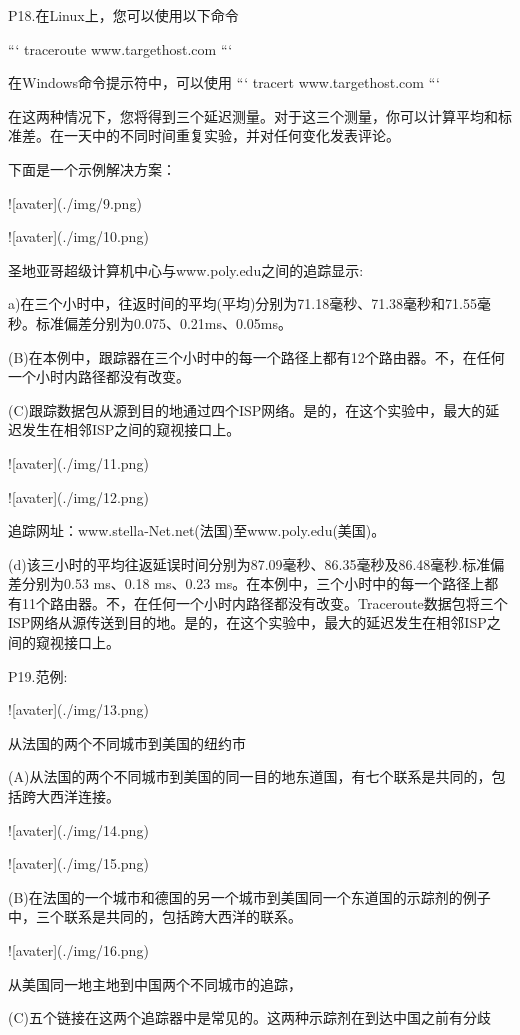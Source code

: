 \documentclass[11pt,UTF8,twoside]{article}
\begin{document}
	P18.在Linux上，您可以使用以下命令
	
	```
	traceroute www.targethost.com 
	```
	
	在Windows命令提示符中，可以使用
	```
	tracert www.targethost.com 
	```
	
	在这两种情况下，您将得到三个延迟测量。对于这三个测量，你可以计算平均和标准差。在一天中的不同时间重复实验，并对任何变化发表评论。
	
	下面是一个示例解决方案：
	
	![avater](./img/9.png)
	
	![avater](./img/10.png)
	
	圣地亚哥超级计算机中心与www.poly.edu之间的追踪显示:
	
	a)在三个小时中，往返时间的平均(平均)分别为71.18毫秒、71.38毫秒和71.55毫秒。标准偏差分别为0.075、0.21ms、0.05ms。
	
	(B)在本例中，跟踪器在三个小时中的每一个路径上都有12个路由器。不，在任何一个小时内路径都没有改变。
	
	(C)跟踪数据包从源到目的地通过四个ISP网络。是的，在这个实验中，最大的延迟发生在相邻ISP之间的窥视接口上。
	
	![avater](./img/11.png)
	
	![avater](./img/12.png)
	
	追踪网址：www.stella-Net.net(法国)至www.poly.edu(美国)。
	
	(d)该三小时的平均往返延误时间分别为87.09毫秒、86.35毫秒及86.48毫秒.标准偏差分别为0.53 ms、0.18 ms、0.23 ms。在本例中，三个小时中的每一个路径上都有11个路由器。不，在任何一个小时内路径都没有改变。Traceroute数据包将三个ISP网络从源传送到目的地。是的，在这个实验中，最大的延迟发生在相邻ISP之间的窥视接口上。
	
	P19.范例:
	
	![avater](./img/13.png)
	
	从法国的两个不同城市到美国的纽约市
	
	(A)从法国的两个不同城市到美国的同一目的地东道国，有七个联系是共同的，包括跨大西洋连接。
	
	![avater](./img/14.png)
	
	![avater](./img/15.png)
	
	(B)在法国的一个城市和德国的另一个城市到美国同一个东道国的示踪剂的例子中，三个联系是共同的，包括跨大西洋的联系。
	
	![avater](./img/16.png)
	
	从美国同一地主地到中国两个不同城市的追踪，
	
	(C)五个链接在这两个追踪器中是常见的。这两种示踪剂在到达中国之前有分歧
	
\end{document}
